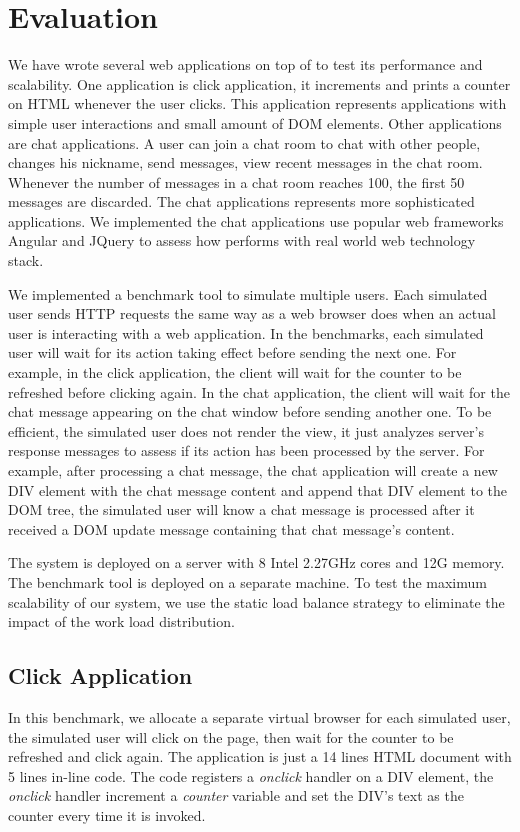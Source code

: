 \section{Evaluation}
\label{sec:eval}
We have wrote several web applications on top of \cb{} to test its
performance and scalability.
One application is click application,
it increments and prints a counter on HTML whenever the user clicks.
This application represents applications with simple user interactions and small amount of DOM elements.
Other applications are chat applications.
A user can join a chat room to chat with other people,
changes his nickname, send messages, view recent messages in the chat room.
Whenever the number of messages in a chat room reaches 100, the first 50 messages
are discarded.
The chat applications represents more sophisticated applications.
We implemented the chat applications use popular web frameworks Angular and JQuery
to assess how \cb{} performs with real world web technology stack.


\chatroomfig{}

We implemented a benchmark tool to simulate multiple users.
Each simulated user sends HTTP requests the same way as
a web browser does when an actual user is interacting with a web application.
In the benchmarks, each simulated user will wait for its action taking effect before
sending the next one.
For example, in the click application, the client will wait for the counter
to be refreshed before clicking again.
In the chat application, the client will wait for
the chat message appearing on the chat window before sending another one.
To be efficient, the simulated user does not render the view,
it just analyzes server's response messages to assess
if its action has been processed by the server.
For example, after processing a chat message,
the chat application will create a new DIV element with the chat message content
and append that DIV element to the DOM tree,
the simulated user will know a chat message is processed after it received
a DOM update message containing that chat message's content.

The \cb{} system is deployed on a server with 8 Intel 2.27GHz cores and 12G memory.
The benchmark tool is deployed on a separate machine.
To test the maximum scalability of our system, we use the static load balance strategy
to eliminate the impact of the work load distribution.

\subsection{Click Application}
In this benchmark,
we allocate a separate virtual browser for each simulated user,
the simulated user will click on the page,
then wait for the counter to be refreshed and click again.
The application is just a 14 lines HTML document with 5 lines in-line \js{} code.
The \js{} code registers a \emph{onclick} handler on a DIV element,
the \emph{onclick} handler increment a \emph{counter} variable and set the DIV's text as
the counter every time it is invoked.
\clickthroughput{}

